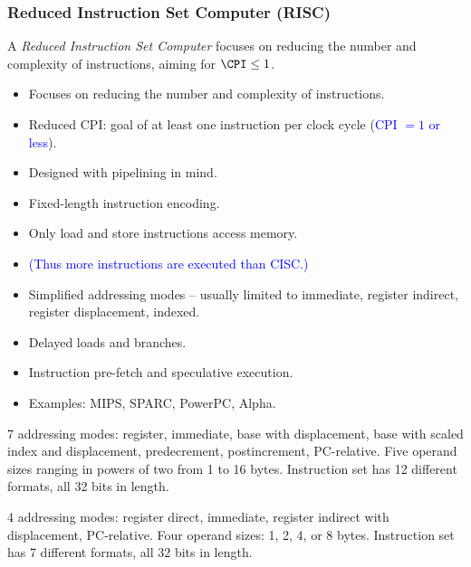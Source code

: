 \subsubsection{Reduced Instruction Set Computer (RISC)}

\begin{definition}[RISC]
A \emph{Reduced Instruction Set Computer} focuses on reducing the number and
complexity of instructions, aiming for $\CPI \le 1$.
\end{definition}
\begin{itemize}
  \item Focuses on reducing the number and complexity of instructions.
  \item Reduced CPI: goal of at least one instruction per clock cycle
  (\textcolor{blue}{CPI $=1$ or less}).
  \item Designed with pipelining in mind.
  \item Fixed-length instruction encoding.
  \item Only load and store instructions access memory.
  \item \textcolor{blue}{(Thus more instructions are executed than CISC.)}
  \item Simplified addressing modes -- usually limited to immediate,
  register indirect, register displacement, indexed.
  \item Delayed loads and branches.
  \item Instruction pre-fetch and speculative execution.
  \item Examples: MIPS, SPARC, PowerPC, Alpha.
\end{itemize}

\begin{eg}
7 addressing
modes: register, immediate, base with displacement, base with scaled index
and displacement, predecrement, postincrement, PC-relative. Five operand
sizes ranging in powers of two from 1 to 16 bytes. Instruction set has 12
different formats, all 32 bits in length.
\end{eg}

\begin{eg}
4 addressing modes: register direct,
immediate, register indirect with displacement, PC-relative. Four operand
sizes: 1, 2, 4, or 8 bytes. Instruction set has 7 different formats, all 32
bits in length.
\end{eg}

